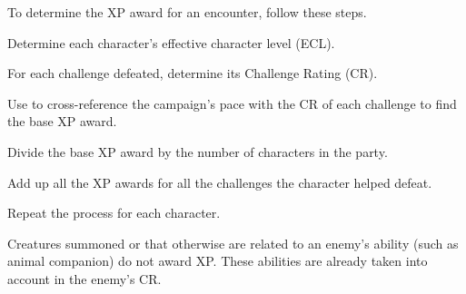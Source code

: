 To determine the XP award for an encounter, follow these steps.
\begin{enumerate*}
	\item Determine each character's effective character level (ECL).
	\item For each challenge defeated, determine its Challenge Rating (CR).
	\item Use  to cross-reference the campaign's pace with the CR of each challenge to find the base XP award.
	\item Divide the base XP award by the number of characters in the party.
	\item Add up all the XP awards for all the challenges the character helped defeat.
	\item Repeat the process for each character.
\end{enumerate*}

Creatures summoned or that otherwise are related to an enemy's ability (such as animal companion) do not award XP. These abilities are already taken into account in the enemy's CR.
